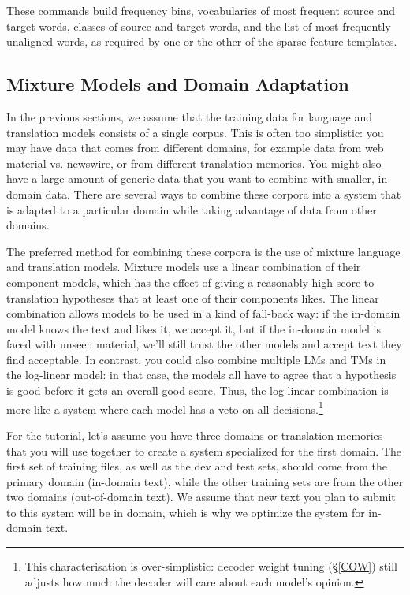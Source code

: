 \documentclass[11pt,letterpaper]{article}
\begin{document}
These commands build frequency bins, vocabularies of most frequent source and
target words, classes of source and target words, and the list of most
frequently unaligned words, as required by one or the other of the sparse
feature templates.

\subsection{Mixture Models and Domain Adaptation} \label{MIX}

In the previous sections, we assume that the training data for
language and translation models consists of a single corpus.  This is often too
simplistic: you may have data that comes from different domains, for example
data from web material vs. newswire, or from different translation memories.
You might also have a large amount of generic data that you want to combine
with smaller, in-domain data.  There are several ways to combine these corpora
into a system that is adapted to a particular domain while taking advantage of
data from other domains.

The preferred method for combining these corpora is the use of mixture language
and translation models.
Mixture models use a linear combination of their component models, which has
the effect of giving a reasonably high score to translation hypotheses that at least
one of their components likes.  The linear combination allows models to
be used in a kind of fall-back way: if the in-domain model knows the text and
likes it, we accept it, but if the in-domain model is faced with unseen
material, we'll still trust the other models and accept text they find
acceptable.  In contrast, you could also combine multiple LMs and TMs in the
log-linear model: in that case, the models all have to agree that a hypothesis
is good before it gets an overall good score.  Thus, the log-linear combination
is more like a system where each model has a veto on all
decisions.\footnote{This characterisation is over-simplistic: decoder weight
tuning (\S\ref{COW}) still adjusts how much the decoder will care about each
model's opinion.}

For the tutorial, let's assume
you have three domains or translation memories that you will use
together to create a system specialized for the first domain.  The first set of
training files, as well as the dev and test sets, should come from the primary
domain (in-domain text), while the other training sets are from the other two
domains (out-of-domain text).  We assume that new text you plan to submit to
this system will be in domain, which is why we optimize the system for
in-domain text.
\end{document}
